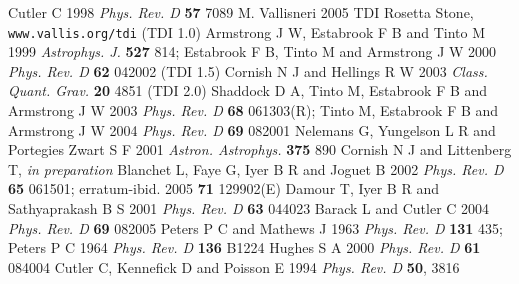 \documentclass{iopart}
\begin{document}
\begin{thebibliography}{10}
%
 Cutler C 1998 \emph{Phys. Rev. D} \textbf{57} 7089
%
 M. Vallisneri 2005 TDI Rosetta Stone, \texttt{www.vallis.org/tdi}
 (TDI 1.0) Armstrong J W, Estabrook F B and Tinto M 1999
\emph{Astrophys. J.} \textbf{527} 814; Estabrook F B, Tinto M and Armstrong J W 2000 \emph{Phys. Rev. D} \textbf{62} 042002
 (TDI 1.5) Cornish N J and Hellings R W 2003 \emph{Class. Quant. Grav.} \textbf{20} 4851
 (TDI 2.0) Shaddock D A, Tinto M, Estabrook F B and Armstrong J W 2003 \emph{Phys. Rev. D} \textbf{68} 061303(R); Tinto M, Estabrook F B and Armstrong J W 2004 \emph{Phys. Rev. D} \textbf{69} 082001
 Nelemans G, Yungelson L R and Portegies Zwart S F 2001 \emph{Astron. Astrophys.} \textbf{375} 890
 Cornish N J and Littenberg T, {\em in preparation}
%
 Blanchet L, Faye G, Iyer B R and Joguet B 2002 \emph{Phys. Rev. D} \textbf{65} 061501; erratum-ibid. 2005 \textbf{71} 129902(E)
 Damour T, Iyer B R and Sathyaprakash B S 2001 \emph{Phys. Rev. D} \textbf{63} 044023
 Barack L and Cutler C 2004 \emph{Phys. Rev. D} {\bf 69} 082005
 Peters P C and Mathews J 1963 \emph{Phys. Rev. D} {\bf 131} 435; Peters P C 1964 \emph{Phys. Rev. D} {\bf 136} B1224
 Hughes S A 2000 \emph{Phys. Rev. D} {\bf 61} 084004
 Cutler C, Kennefick D and Poisson E 1994 \emph{Phys. Rev. D} {\bf 50}, 3816
%
\end{thebibliography}
\end{document}
